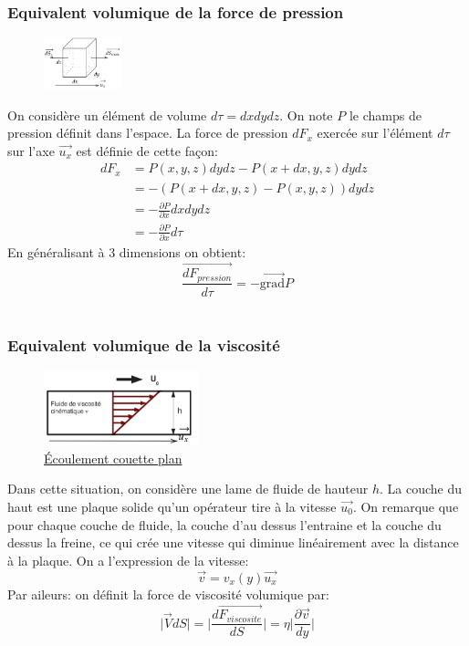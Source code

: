 \documentclass[a4paper,10pt]{report}
\begin{document}
\subsubsection{Equivalent volumique de la force de pression}
\begin{figure}
 \includegraphics[width=0.2\textwidth]{equivalent_force_de_pression_volumique}
\end{figure}
On considère un élément de volume $d\tau = dxdydz$. On note $P$ le champs de pression définit dans l'espace. La force de pression $dF_x$ exercée sur l'élément $d\tau$ sur l'axe $\vec{u_x}$ est définie de cette façon:
\begin{align*}
 dF_x &= P(x,y,z)dydz - P(x+dx, y, z)dydz \\
           &= - (P(x+dx, y, z) - P(x, y, z))dydz \\
           &= - \frac{\partial P}{\partial x} dxdydz \\
           &= - \frac{\partial P}{\partial x} d\tau
\end{align*}
 En généralisant à 3 dimensions on obtient:
$$ \boxed{\frac{\vec{dF_{pression}}}{d\tau} = - \vec{\text{grad}}P} $$
\\
\subsubsection{Equivalent volumique de la viscosité}

\begin{figure}
 \includegraphics[width=0.4\textwidth]{ecoulement_couette_plan}
  \caption{\href{https://fr.wikipedia.org/wiki/écoulement_de_Couette}{Écoulement couette plan}}
\end{figure}
Dans cette situation, on considère une lame de fluide de hauteur $h$. La couche du haut est une plaque solide qu'un opérateur tire à la vitesse $\vec{u_0}$. On remarque que pour chaque couche de fluide, la couche d'au dessus l'entraine et la couche du dessus la freine, ce qui crée une vitesse qui diminue linéairement avec la distance à la plaque. On a l'expression de la vitesse:
$$ \vec{v} = v_x(y)\vec{u_x}$$
Par aileurs: on définit la force de viscosité volumique par:
$$ \vert \vec{V}dS \vert =\vert \frac{d \vec{F_{viscosite}}}{d S} \vert = \eta \vert \frac{\partial \vec{v}}{dy} \vert$$
\end{document}
